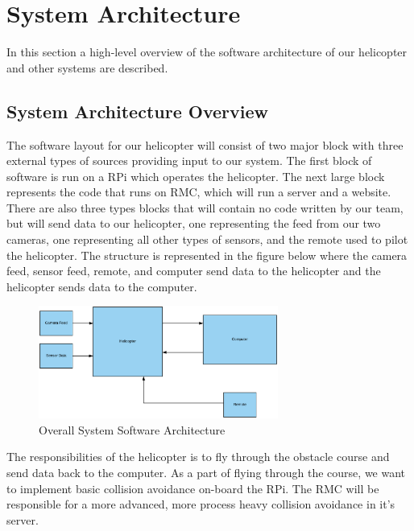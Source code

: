 \documentclass[onecolumn, draftclsnofoot, 10pt, compsoc]{IEEEtran}
\begin{document}
\section{System Architecture}

In this section a high-level overview of the software architecture of our helicopter and other systems are described.
\subsection{System Architecture Overview}

The software layout for our helicopter will consist of two major block with three external types of sources providing input to our system. The first block of software is run on a RPi which operates the helicopter. The next large block represents the code that runs on RMC, which will run a server and a website. There are also three types blocks that will contain no code written by our team, but will send data to our helicopter, one representing the feed from our two cameras, one representing all other types of sensors, and the remote used to pilot the helicopter. The structure is represented in the figure below where the camera feed, sensor feed, remote, and computer send data to the helicopter and the helicopter sends data to the computer.

\begin{figure}[h]
    \centering
    \includegraphics[width=0.7\textwidth]{graphics/high_level_overall_arch.eps}
    \caption{Overall System Software Architecture}
    \label{fig:OverallSystemArchitecture}
\end{figure}

The responsibilities of the helicopter is to fly through the obstacle course and send data back to the computer. As a part of flying through the course, we want to implement basic collision avoidance on-board the RPi. The RMC will be responsible for a more advanced, more process heavy collision avoidance in it's server.
\end{document}
